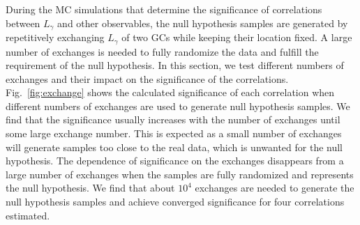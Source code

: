 \documentclass[doublespace,nopageskip]{VTthesis} %
\begin{document}
\begin{appendices}
During the MC simulations that determine the significance of correlations between $L_\gamma$ and other observables, the null hypothesis samples are generated by repetitively exchanging $L_\gamma$ of two GCs while keeping their location fixed. A large number of exchanges is needed to fully randomize the data and fulfill the requirement of the null hypothesis. In this section, we test different numbers of exchanges and their impact on the significance of the correlations. Fig.~\ref{fig:exchange} shows the calculated significance of each correlation when different numbers of exchanges are used to generate null hypothesis samples. We find that the significance usually increases with the number of exchanges until some large exchange number. This is expected as a small number of exchanges will generate samples too close to the real data, which is unwanted for the null hypothesis. The dependence of significance on the exchanges disappears from a large number of exchanges when the samples are fully randomized and represents the null hypothesis. We find that about $10^4$ exchanges are needed to generate the null hypothesis samples and achieve converged significance for four correlations estimated.


\end{appendices}
\end{document}
